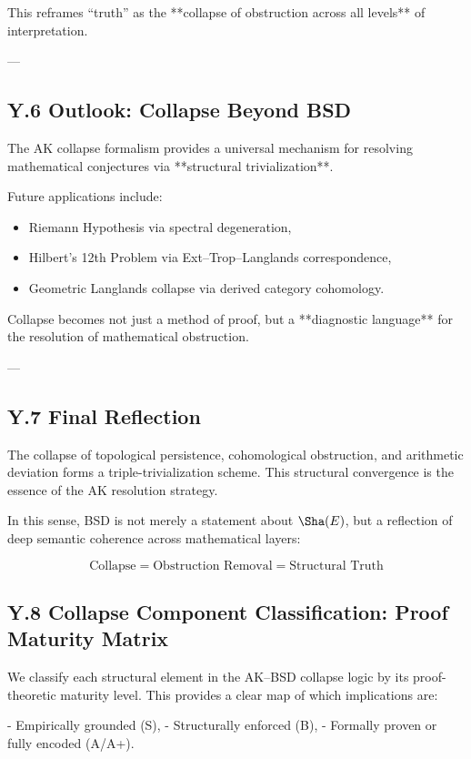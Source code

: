 \documentclass[11pt]{article}
\theoremstyle{definition}
\begin{document}
This reframes “truth” as the **collapse of obstruction across all levels** of interpretation.

---

\subsection*{Y.6 Outlook: Collapse Beyond BSD}

The AK collapse formalism provides a universal mechanism  
for resolving mathematical conjectures via **structural trivialization**.  

Future applications include:
\begin{itemize}
  \item Riemann Hypothesis via spectral degeneration,
  \item Hilbert’s 12th Problem via Ext–Trop–Langlands correspondence,
  \item Geometric Langlands collapse via derived category cohomology.
\end{itemize}

Collapse becomes not just a method of proof,  
but a **diagnostic language** for the resolution of mathematical obstruction.

---

\subsection*{Y.7 Final Reflection}

The collapse of topological persistence, cohomological obstruction,  
and arithmetic deviation forms a triple-trivialization scheme.  
This structural convergence is the essence of the AK resolution strategy.

In this sense, BSD is not merely a statement about \( \Sha(E) \),  
but a reflection of deep semantic coherence across mathematical layers:

\[
\text{Collapse} = \text{Obstruction Removal} = \text{Structural Truth}
\]


\subsection*{Y.8 Collapse Component Classification: Proof Maturity Matrix}

We classify each structural element in the AK–BSD collapse logic by its proof-theoretic maturity level.  
This provides a clear map of which implications are:

- Empirically grounded (S),
- Structurally enforced (B),
- Formally proven or fully encoded (A/A+).
\end{document}
